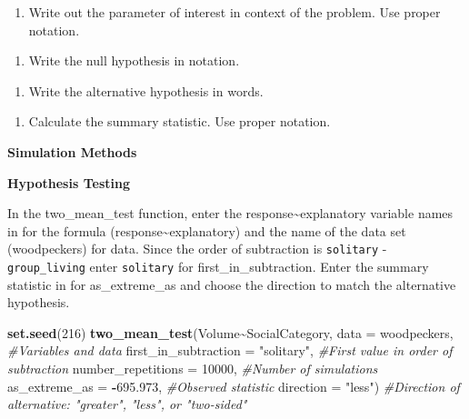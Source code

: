 \documentclass[
]{report}
\newenvironment{Shaded}{\begin{snugshade}}{\end{snugshade}}
\newcommand{\AttributeTok}[1]{\textcolor[rgb]{0.13,0.29,0.53}{#1}}
\newcommand{\CommentTok}[1]{\textcolor[rgb]{0.56,0.35,0.01}{\textit{#1}}}
\newcommand{\DecValTok}[1]{\textcolor[rgb]{0.00,0.00,0.81}{#1}}
\newcommand{\FloatTok}[1]{\textcolor[rgb]{0.00,0.00,0.81}{#1}}
\newcommand{\FunctionTok}[1]{\textcolor[rgb]{0.13,0.29,0.53}{\textbf{#1}}}
\newcommand{\NormalTok}[1]{#1}
\newcommand{\SpecialCharTok}[1]{\textcolor[rgb]{0.81,0.36,0.00}{\textbf{#1}}}
\newcommand{\StringTok}[1]{\textcolor[rgb]{0.31,0.60,0.02}{#1}}
\providecommand{\tightlist}{%
  \setlength{\itemsep}{0pt}\setlength{\parskip}{0pt}}
\begin{document}
\begin{enumerate}
\def\labelenumi{\arabic{enumi}.}
\tightlist
\item
  Write out the parameter of interest in context of the problem. Use proper notation.
\end{enumerate}

\vspace{0.5in}

\begin{enumerate}
\def\labelenumi{\arabic{enumi}.}
\setcounter{enumi}{1}
\tightlist
\item
  Write the null hypothesis in notation.
\end{enumerate}

\vspace{0.5in}

\begin{enumerate}
\def\labelenumi{\arabic{enumi}.}
\setcounter{enumi}{2}
\tightlist
\item
  Write the alternative hypothesis in words.
\end{enumerate}

\vspace{0.5in}

\begin{enumerate}
\def\labelenumi{\arabic{enumi}.}
\setcounter{enumi}{3}
\tightlist
\item
  Calculate the summary statistic. Use proper notation.
\end{enumerate}

\vspace{0.5in}

\textbf{Simulation Methods}

\textbf{Hypothesis Testing}

In the two\_mean\_test function, enter the response\textasciitilde explanatory variable names in for the formula (response\textasciitilde explanatory) and the name of the data set (woodpeckers) for data. Since the order of subtraction is \texttt{solitary} - \texttt{group\_living} enter \texttt{solitary} for first\_in\_subtraction. Enter the summary statistic in for as\_extreme\_as and choose the direction to match the alternative hypothesis.

\begin{Shaded}
\begin{Highlighting}[]
\FunctionTok{set.seed}\NormalTok{(}\DecValTok{216}\NormalTok{)}
\FunctionTok{two\_mean\_test}\NormalTok{(Volume}\SpecialCharTok{\textasciitilde{}}\NormalTok{SocialCategory, }\AttributeTok{data =}\NormalTok{ woodpeckers,  }\CommentTok{\#Variables and data}
                    \AttributeTok{first\_in\_subtraction =} \StringTok{"solitary"}\NormalTok{, }\CommentTok{\#First value in order of subtraction}
                    \AttributeTok{number\_repetitions =} \DecValTok{10000}\NormalTok{,  }\CommentTok{\#Number of simulations}
                    \AttributeTok{as\_extreme\_as =} \SpecialCharTok{{-}}\FloatTok{695.973}\NormalTok{, }\CommentTok{\#Observed statistic}
                    \AttributeTok{direction =} \StringTok{"less"}\NormalTok{)  }\CommentTok{\#Direction of alternative: "greater", "less", or "two{-}sided"}
\end{Highlighting}
\end{Shaded}
\end{document}
